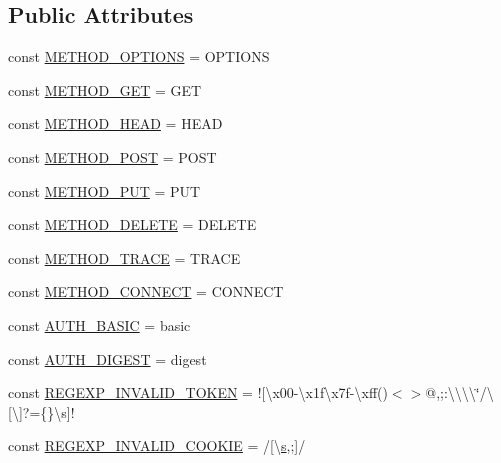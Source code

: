 \subsection*{Public Attributes}
\begin{DoxyCompactItemize}
\item 
const \hyperlink{classHTTP__Request2_a65c57cec36149d220f6cd30d43eb59b7}{M\+E\+T\+H\+O\+D\+\_\+\+O\+P\+T\+I\+O\+NS} = \textquotesingle{}O\+P\+T\+I\+O\+NS\textquotesingle{}
\item 
const \hyperlink{classHTTP__Request2_a7c1f37cc2543c9d0fe5f09086bd50b3a}{M\+E\+T\+H\+O\+D\+\_\+\+G\+ET} = \textquotesingle{}G\+ET\textquotesingle{}
\item 
const \hyperlink{classHTTP__Request2_abb68a728946a9da5f19d5bb0cf676d58}{M\+E\+T\+H\+O\+D\+\_\+\+H\+E\+AD} = \textquotesingle{}H\+E\+AD\textquotesingle{}
\item 
const \hyperlink{classHTTP__Request2_ae42a6ae396ef8abacf8e54a64a64df22}{M\+E\+T\+H\+O\+D\+\_\+\+P\+O\+ST} = \textquotesingle{}P\+O\+ST\textquotesingle{}
\item 
const \hyperlink{classHTTP__Request2_a02fd90821d762476b8ec1e226c374174}{M\+E\+T\+H\+O\+D\+\_\+\+P\+UT} = \textquotesingle{}P\+UT\textquotesingle{}
\item 
const \hyperlink{classHTTP__Request2_ab6edf309179aa4535aa6a9b12b260978}{M\+E\+T\+H\+O\+D\+\_\+\+D\+E\+L\+E\+TE} = \textquotesingle{}D\+E\+L\+E\+TE\textquotesingle{}
\item 
const \hyperlink{classHTTP__Request2_a9877a1980431a869bce427ec64c923eb}{M\+E\+T\+H\+O\+D\+\_\+\+T\+R\+A\+CE} = \textquotesingle{}T\+R\+A\+CE\textquotesingle{}
\item 
const \hyperlink{classHTTP__Request2_af03c573103c3f5bdf3ec9c3e95a08e59}{M\+E\+T\+H\+O\+D\+\_\+\+C\+O\+N\+N\+E\+CT} = \textquotesingle{}C\+O\+N\+N\+E\+CT\textquotesingle{}
\item 
const \hyperlink{classHTTP__Request2_a2282d82f67f929d936b2b2b6c2317dd1}{A\+U\+T\+H\+\_\+\+B\+A\+S\+IC} = \textquotesingle{}basic\textquotesingle{}
\item 
const \hyperlink{classHTTP__Request2_a4b05b6842e05183dc3ac3c7ff613b3c7}{A\+U\+T\+H\+\_\+\+D\+I\+G\+E\+ST} = \textquotesingle{}digest\textquotesingle{}
\item 
const \hyperlink{classHTTP__Request2_a73691a6fc7003599b47be20a8c728bbf}{R\+E\+G\+E\+X\+P\+\_\+\+I\+N\+V\+A\+L\+I\+D\+\_\+\+T\+O\+K\+EN} = \textquotesingle{}!\mbox{[}\textbackslash{}x00-\/\textbackslash{}x1f\textbackslash{}x7f-\/\textbackslash{}xff()$<$$>$@,;\+:\textbackslash{}\textbackslash{}\textbackslash{}\textbackslash{}\char`\"{}/\textbackslash{}\mbox{[}\textbackslash{}\mbox{]}?=\{\}\textbackslash{}s\mbox{]}!\textquotesingle{}
\item 
const \hyperlink{classHTTP__Request2_ab7fc574a0035ac8e940f6cd3456b0c28}{R\+E\+G\+E\+X\+P\+\_\+\+I\+N\+V\+A\+L\+I\+D\+\_\+\+C\+O\+O\+K\+IE} = \textquotesingle{}/\mbox{[}\textbackslash{}\hyperlink{respond_8min_8js_ad9a7d92cb87932d25187fdec3ba1b621}{s},;\mbox{]}/\textquotesingle{}
\end{DoxyCompactItemize}
